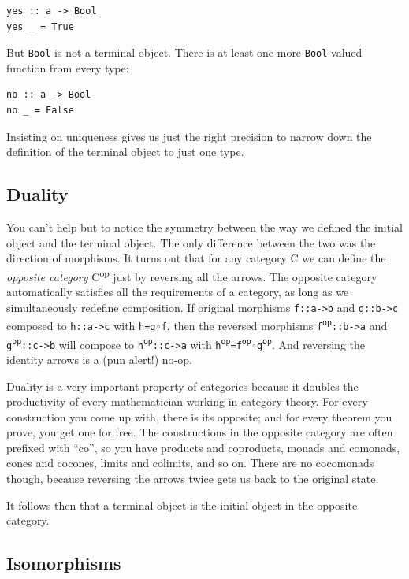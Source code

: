 \begin{verbatim}
yes :: a -> Bool
yes _ = True
\end{verbatim}

But \texttt{Bool} is not a terminal object. There is at least one more
\texttt{Bool}-valued function from every type:

\begin{verbatim}
no :: a -> Bool
no _ = False
\end{verbatim}

Insisting on uniqueness gives us just the right precision to narrow down
the definition of the terminal object to just one type.

\subsection{Duality}\label{duality}

You can't help but to notice the symmetry between the way we defined the
initial object and the terminal object. The only difference between the
two was the direction of morphisms. It turns out that for any category C
we can define the \emph{opposite category} C\textsuperscript{op} just by
reversing all the arrows. The opposite category automatically satisfies
all the requirements of a category, as long as we simultaneously
redefine composition. If original morphisms
\texttt{f::a->b} and \texttt{g::b->c} composed
to \texttt{h::a->c} with \texttt{h=g◦f}, then the reversed
morphisms \texttt{f\textsuperscript{op}::b->a} and
\texttt{g\textsuperscript{op}::c->b} will compose to
\texttt{h\textsuperscript{op}::c->a} with \texttt{h\textsuperscript{op}=f\textsuperscript{op}◦g\textsuperscript{op}}. And reversing
the identity arrows is a (pun alert!) no-op.

Duality is a very important property of categories because it doubles
the productivity of every mathematician working in category theory. For
every construction you come up with, there is its opposite; and for
every theorem you prove, you get one for free. The constructions in the
opposite category are often prefixed with ``co'', so you have products
and coproducts, monads and comonads, cones and cocones, limits and
colimits, and so on. There are no cocomonads though, because reversing
the arrows twice gets us back to the original state.

It follows then that a terminal object is the initial object in the
opposite category.

\subsection{Isomorphisms}\label{isomorphisms}

